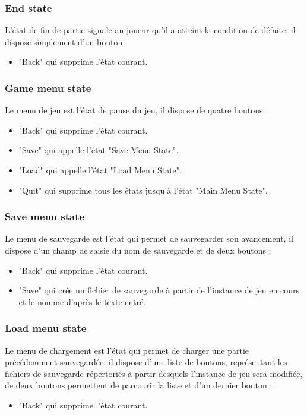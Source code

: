 \documentclass[a4paper]{memoir}
\begin{document}
				\subsubsection{End state}
					L’état de fin de partie signale au joueur qu’il a atteint la condition de défaite, il dispose simplement d’un bouton :
					\begin{itemize}[label=$\bullet$]
						\item "Back" qui supprime l’état courant.
					\end{itemize}
					
				\subsubsection{Game menu state}
					Le menu de jeu est l’état de pause du jeu, il dispose de quatre boutons :
					\begin{itemize}[label=$\bullet$]
						\item "Back" qui supprime l’état courant.
						\item "Save" qui appelle l’état "Save Menu State".
						\item "Load" qui appelle l’état "Load Menu State".
						\item "Quit" qui supprime tous les états jusqu’à l’état "Main Menu State".
					\end{itemize}
					
				\subsubsection{Save menu state}
					Le menu de sauvegarde est l’état qui permet de sauvegarder son avancement, il dispose d’un champ de saisie du nom de sauvegarde et de deux boutons :
					\begin{itemize}[label=$\bullet$]
						\item "Back" qui supprime l’état courant.
						\item "Save" qui crée un fichier de sauvegarde à partir de l’instance de jeu en cours et le nomme d’après le texte entré.
					\end{itemize}
					
				\subsubsection{Load menu state}
					Le menu de chargement est l’état qui permet de charger une partie précédemment sauvegardée, il dispose d’une liste de boutons, représentant les fichiers de sauvegarde répertoriés à partir desquels l’instance de jeu sera modifiée, de deux boutons permettent de parcourir la liste et d’un dernier bouton :
					\begin{itemize}[label=$\bullet$]
						\item "Back" qui supprime l’état courant.
					\end{itemize}
			
\end{document}
